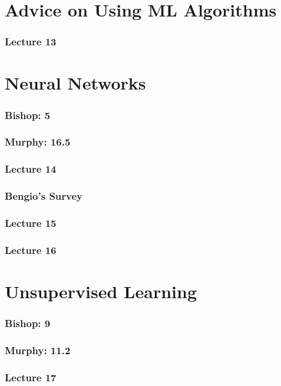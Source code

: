 \documentclass[english, 11pt]{article}
\begin{document}
\section{Advice on Using ML Algorithms}
		\subsubsection{Lecture 13}

\section{Neural Networks}
		\subsubsection{Bishop: 5}
		\subsubsection{Murphy: 16.5}
		\subsubsection{Lecture 14}

		\subsubsection{Bengio's Survey}
		\subsubsection{Lecture 15}

		\subsubsection{Lecture 16}

\section{Unsupervised Learning}
		\subsubsection{Bishop: 9}
		\subsubsection{Murphy: 11.2}
		\subsubsection{Lecture 17}
\end{document}
